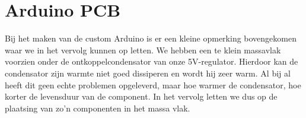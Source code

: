 \section{Arduino PCB}
Bij het maken van de custom Arduino is er een kleine opmerking bovengekomen waar we in het vervolg kunnen op letten. We hebben een te klein massavlak voorzien onder de ontkoppelcondensator van onze 5V-regulator. Hierdoor kan de condensator zijn warmte niet goed dissiperen en wordt hij zeer warm. Al bij al heeft dit geen echte problemen opgeleverd, maar hoe warmer de condensator, hoe korter de levensduur van de component. In het vervolg letten we dus op de plaatsing van zo'n componenten in het massa vlak.